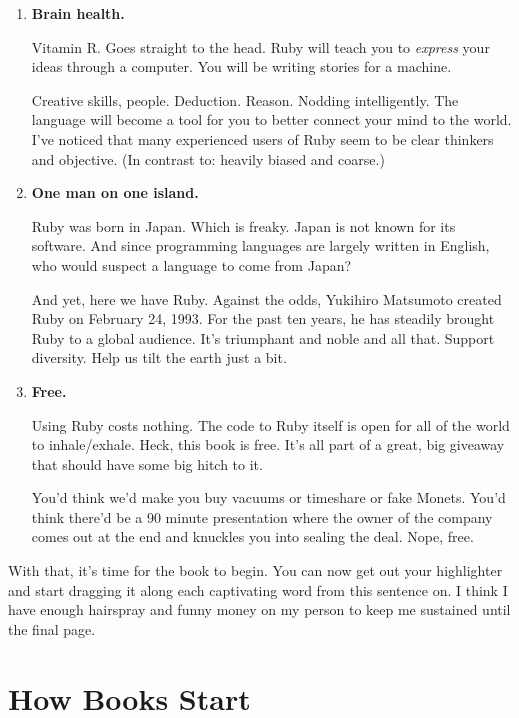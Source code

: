 \documentclass[12pt,twoside]{report}
\begin{document}
\begin{enumerate}
\item {\bf Brain health.}

Vitamin R.  Goes straight to the head.  Ruby will teach you to {\em
  express} your ideas through a computer.  You will be writing stories
for a machine.



Creative skills, people.  Deduction.  Reason.  Nodding
intelligently. The language will become a tool for you to better
connect your mind to the world. I've noticed that many experienced
users of Ruby seem to be clear thinkers and objective.  (In contrast
to: heavily biased and coarse.)


\item {\bf One man on one island.}

Ruby was born in Japan.  Which is freaky.  Japan is not known for its
software.  And since programming languages are largely written in
English, who would suspect a language to come from Japan?



And yet, here we have Ruby.  Against the odds, Yukihiro Matsumoto
created Ruby on February 24, 1993.  For the past ten years, he has
steadily brought Ruby to a global audience.  It's triumphant and noble
and all that.  Support diversity. Help us tilt the earth just a bit.


\item {\bf Free.}

Using Ruby costs nothing.  The code to Ruby itself is open for all of
the world to inhale/exhale.  Heck, this book is free.  It's all part
of a great, big giveaway that should have some big hitch to it.



You'd think we'd make you buy vacuums or timeshare or fake
Monets. You'd think there'd be a 90 minute presentation where the
owner of the company comes out at the end and knuckles you into
sealing the deal. Nope, free.


\end{enumerate}

With that, it's time for the book to begin.  You can now get out your
highlighter and start dragging it along each captivating word from
this sentence on.  I think I have enough hairspray and funny money on
my person to keep me sustained until the final page.
	
\section{How Books Start}
\end{document}
